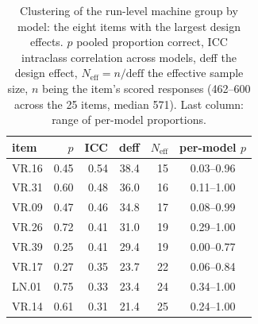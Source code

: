 \begin{table}[t]
\caption{Clustering of the run-level machine group by model: the eight items with the largest design effects. $p$ pooled proportion correct, ICC intraclass correlation across models, deff the design effect, $N_{\text{eff}}=n/\text{deff}$ the effective sample size, $n$ being the item's scored responses (462--600 across the 25 items, median 571). Last column: range of per-model proportions.}
\label{tab:cluster}\centering
\begin{tabular}{lrrrrc}\toprule
item & $p$ & ICC & deff & $N_{\text{eff}}$ & per-model $p$ \\\midrule
VR.16 & 0.45 & 0.54 & 38.4 & 15 & 0.03--0.96 \\
VR.31 & 0.60 & 0.48 & 36.0 & 16 & 0.11--1.00 \\
VR.09 & 0.47 & 0.46 & 34.8 & 17 & 0.08--0.99 \\
VR.26 & 0.72 & 0.41 & 31.0 & 19 & 0.29--1.00 \\
VR.39 & 0.25 & 0.41 & 29.4 & 19 & 0.00--0.77 \\
VR.17 & 0.27 & 0.35 & 23.7 & 22 & 0.06--0.84 \\
LN.01 & 0.75 & 0.33 & 23.4 & 24 & 0.34--1.00 \\
VR.14 & 0.61 & 0.31 & 21.4 & 25 & 0.24--1.00 \\
\bottomrule\end{tabular}\end{table}
